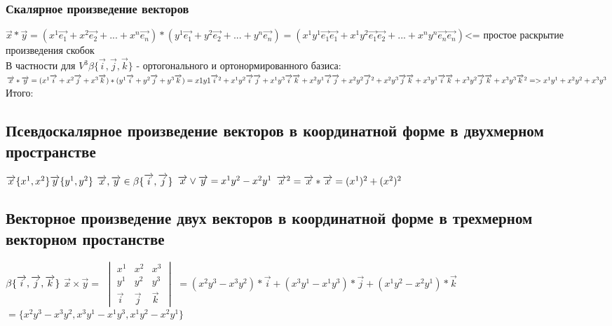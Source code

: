 \documentclass{article}
\begin{document}
\subsubsection{Скалярное произведение векторов}
$\overrightarrow{x}*\overrightarrow{y}=(x^1\overrightarrow{e_1}+x^2\overrightarrow{e_2}+...+x^n\overrightarrow{e_n})*(y^1\overrightarrow{e_1}+y^2\overrightarrow{e_2}+...+y^n\overrightarrow{e_n})=(x^1y^1\overrightarrow{e_1}\overrightarrow{e_1}+x^1y^2\overrightarrow{e_1}\overrightarrow{e_2}+...+x^ny^n\overrightarrow{e_n}\overrightarrow{e_n})$<= простое раскрытие произведения скобок\\
В частности для $V^3 \beta\{\overrightarrow{i},\overrightarrow{j},\overrightarrow{k}\}$ - ортогонального и ортонормированного базиса:\\
$\overrightarrow{x}*\overrightarrow{y}=(x^1\overrightarrow{i}+x^2\overrightarrow{j}+x^3\overrightarrow{k})*(y^1\overrightarrow{i}+y^2\overrightarrow{j}+y^3\overrightarrow{k})=x1y1\overrightarrow{i}^2+x^1y^2\overrightarrow{i}\overrightarrow{j}+x^1y^3\overrightarrow{i}\overrightarrow{k}+x^2y^1\overrightarrow{i}\overrightarrow{j}+x^2y^2\overrightarrow{j}^2+x^2y^3\overrightarrow{j}\overrightarrow{k}+x^3y^1\overrightarrow{i}\overrightarrow{k}+x^3y^2\overrightarrow{j}\overrightarrow{k}+x^3y^3\overrightarrow{k}^2 => x^1y^1+x^2y^2+x^3y^3\\$
Итого:
\subsection{Псевдоскалярное произведение векторов в координатной форме в двухмерном пространстве}
$\overrightarrow{x}\{x^1,x^2\}  \overrightarrow{y}\{y^1,y^2\}\\$
$\overrightarrow{x}, \overrightarrow{y} \in \beta\{\overrightarrow{i},\overrightarrow{j}\}\\$
$\overrightarrow{x}\vee\overrightarrow{y}=x^1y^2-x^2y^1\\$
$\overrightarrow{x}^2=\overrightarrow{x}*\overrightarrow{x}=(x^1)^2+(x^2)^2\\$
\subsection{Векторное произведение двух векторов в координатной форме в трехмерном векторном простанстве}
$\beta\{\overrightarrow{i},\overrightarrow{j},\overrightarrow{k}\}\\$
$\overrightarrow{x}\times\overrightarrow{y}=$
$\begin{vmatrix}
    x^1 & x^2 & x^3\\
    y^1 & y^2 & y^3\\
    \overrightarrow{i} & \overrightarrow{j} & \overrightarrow{k}
\end{vmatrix}$
$=(x^2y^3-x^3y^2)*\overrightarrow{i}+(x^3y^1-x^1y^3)*\overrightarrow{j}+(x^1y^2-x^2y^1)*\overrightarrow{k}$
$=\{x^2y^3-x^3y^2,x^3y^1-x^1y^3,x^1y^2-x^2y^1\}$
\end{document}
